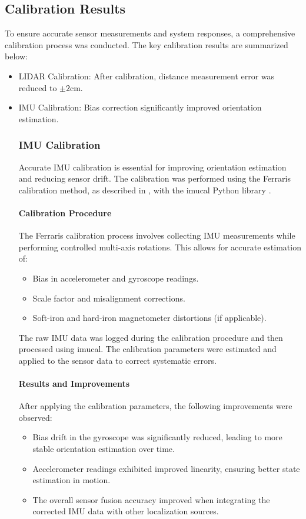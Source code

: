 \documentclass[english,project]{buwthesis}
\begin{document}
\subsection{Calibration Results}
To ensure accurate sensor measurements and system responses, a comprehensive calibration process was conducted. The key calibration results are summarized below:
\begin{itemize}
    \item LIDAR Calibration: After calibration, distance measurement error was reduced to $\pm 2 \text{cm}$.
    \item IMU Calibration: Bias correction significantly improved orientation estimation.
    \subsubsection{IMU Calibration}
Accurate IMU calibration is essential for improving orientation estimation and reducing sensor drift. The calibration was performed using the Ferraris calibration method, as described in \cite{imucal-ferraris-guide}, with the imucal Python library \cite{kuderle2022}.

\paragraph{Calibration Procedure}
The Ferraris calibration process involves collecting IMU measurements while performing controlled multi-axis rotations. This allows for accurate estimation of:
\begin{itemize}
    \item Bias in accelerometer and gyroscope readings.
    \item Scale factor and misalignment corrections.
    \item Soft-iron and hard-iron magnetometer distortions (if applicable).
\end{itemize}

The raw IMU data was logged during the calibration procedure and then processed using imucal. The calibration parameters were estimated and applied to the sensor data to correct systematic errors.

\paragraph{Results and Improvements}
After applying the calibration parameters, the following improvements were observed:
\begin{itemize}
    \item Bias drift in the gyroscope was significantly reduced, leading to more stable orientation estimation over time.
    \item Accelerometer readings exhibited improved linearity, ensuring better state estimation in motion.
    \item The overall sensor fusion accuracy improved when integrating the corrected IMU data with other localization sources.
\end{itemize}


\end{itemize}
\end{document}
